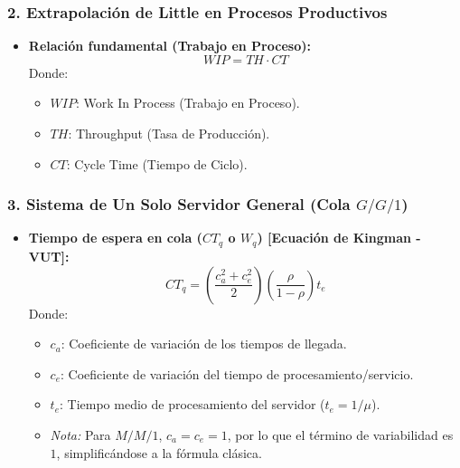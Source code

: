 \documentclass[
]{article}
\providecommand{\tightlist}{%
  \setlength{\itemsep}{0pt}\setlength{\parskip}{0pt}}
\begin{document}
\hypertarget{extrapolaciuxf3n-de-little-en-procesos-productivos}{%
\subsubsection{2. Extrapolación de Little en Procesos
Productivos}\label{extrapolaciuxf3n-de-little-en-procesos-productivos}}

\begin{itemize}
\tightlist
\item
  \textbf{Relación fundamental (Trabajo en Proceso):}
  \[WIP = TH \cdot CT\] Donde:

  \begin{itemize}
  \tightlist
  \item
    \(WIP\): Work In Process (Trabajo en Proceso).
  \item
    \(TH\): Throughput (Tasa de Producción).
  \item
    \(CT\): Cycle Time (Tiempo de Ciclo).
  \end{itemize}
\end{itemize}

\hypertarget{sistema-de-un-solo-servidor-general-cola-gg1}{%
\subsubsection{\texorpdfstring{3. Sistema de Un Solo Servidor General
(Cola
\(G/G/1\))}{3. Sistema de Un Solo Servidor General (Cola G/G/1)}}\label{sistema-de-un-solo-servidor-general-cola-gg1}}

\begin{itemize}
\tightlist
\item
  \textbf{Tiempo de espera en cola (\(CT_q\) o \(W_q\)) {[}Ecuación de
  Kingman - VUT{]}:}
  \[CT_q = \left( \frac{c_a^2 + c_e^2}{2} \right) \left( \frac{\rho}{1 - \rho} \right) t_e\]
  Donde:

  \begin{itemize}
  \tightlist
  \item
    \(c_a\): Coeficiente de variación de los tiempos de llegada.
  \item
    \(c_e\): Coeficiente de variación del tiempo de
    procesamiento/servicio.
  \item
    \(t_e\): Tiempo medio de procesamiento del servidor
    (\(t_e = 1/\mu\)).
  \item
    \emph{Nota:} Para \(M/M/1\), \(c_a = c_e = 1\), por lo que el
    término de variabilidad es \(1\), simplificándose a la fórmula
    clásica.
  \end{itemize}
\end{itemize}
\end{document}
